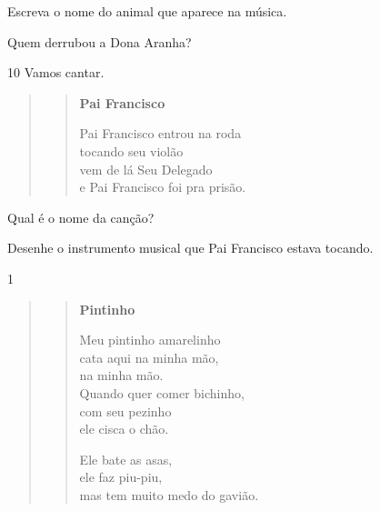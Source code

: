 \begin{escolha}
\item Escreva o nome do animal que aparece na música.


\pagebreak
\item Quem derrubou a Dona Aranha?


\end{escolha}

\num{10} Vamos cantar.

\begin{quote}
\begin{verse}
\textbf{Pai Francisco}

Pai Francisco entrou na roda\\
tocando seu violão\\
vem de lá Seu Delegado\\
e Pai Francisco foi pra prisão.
\end{verse}
\end{quote}


\begin{escolha}
\item Qual é o nome da canção?


\item Desenhe o instrumento musical que Pai Francisco estava tocando.

\begin{mdframed}[linewidth=2pt,linecolor=salmao,roundcorner=10pt]
\vspace{8cm}
\end{mdframed}
\end{escolha}


\num{1}

\begin{quote}
\begin{verse}
\textbf{Pintinho}

Meu pintinho amarelinho\\
cata aqui na minha mão,\\ 
na minha mão.\\
Quando quer comer bichinho,\\ 
com seu pezinho\\ 
ele cisca o chão.

Ele bate as asas,\\
ele faz piu-piu,\\ 
mas tem muito medo do gavião.
\end{verse}

\end{quote}


